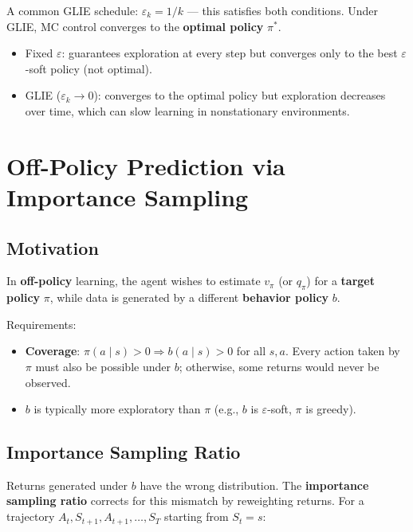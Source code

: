 \documentclass[11pt,a4paper]{article}
\theoremstyle{definition}
\theoremstyle{plain}
\theoremstyle{remark}
\begin{document}
A common GLIE schedule: $\varepsilon_k = 1/k$ — this satisfies both conditions. Under GLIE, MC control converges to the \textbf{optimal policy} $\pi^*$.

\begin{tcolorbox}[colback=orange!5!white, colframe=orange!75!black, title={\textbf{Key Trade-off}}]
\begin{itemize}
    \item Fixed $\varepsilon$: guarantees exploration at every step but converges only to the best $\varepsilon$-soft policy (not optimal).
    \item GLIE ($\varepsilon_k \to 0$): converges to the optimal policy but exploration decreases over time, which can slow learning in nonstationary environments.
\end{itemize}
\end{tcolorbox}

\section{Off-Policy Prediction via Importance Sampling}

\subsection{Motivation}

In \textbf{off-policy} learning, the agent wishes to estimate $v_\pi$ (or $q_\pi$) for a \textbf{target policy} $\pi$, while data is generated by a different \textbf{behavior policy} $b$.

Requirements:
\begin{itemize}
    \item \textbf{Coverage}: $\pi(a \mid s) > 0 \Rightarrow b(a \mid s) > 0$ for all $s, a$. Every action taken by $\pi$ must also be possible under $b$; otherwise, some returns would never be observed.
    \item $b$ is typically more exploratory than $\pi$ (e.g., $b$ is $\varepsilon$-soft, $\pi$ is greedy).
\end{itemize}

\subsection{Importance Sampling Ratio}

Returns generated under $b$ have the wrong distribution. The \textbf{importance sampling ratio} corrects for this mismatch by reweighting returns. For a trajectory $A_t, S_{t+1}, A_{t+1}, \ldots, S_T$ starting from $S_t = s$:
\end{document}
